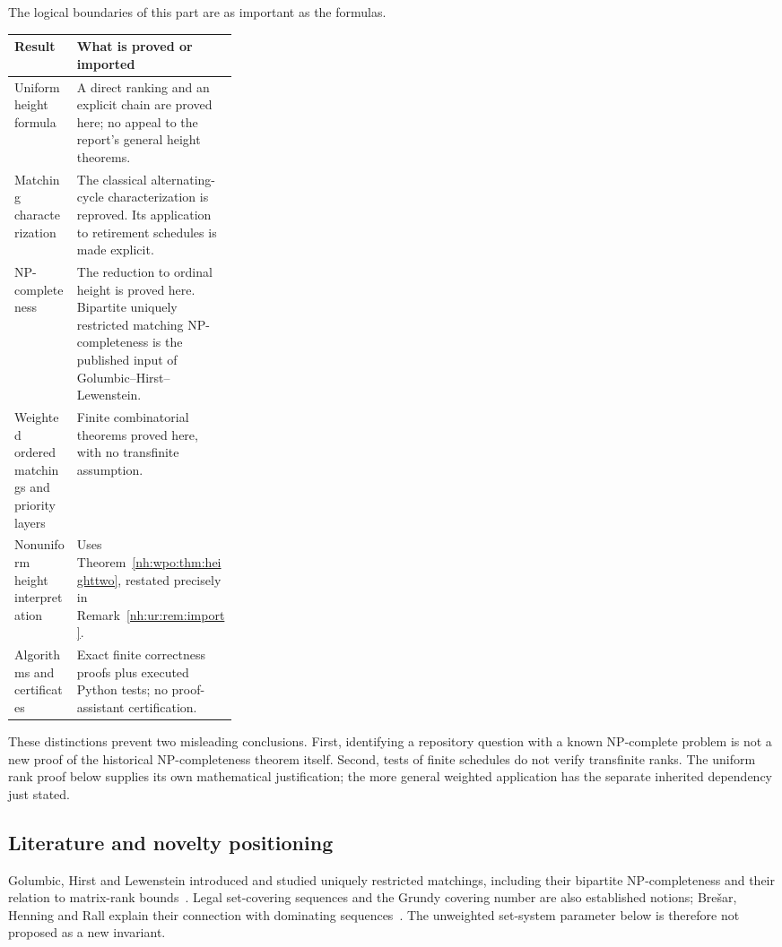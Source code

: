 \documentclass[11pt,a4paper]{article}
\theoremstyle{definition}
\theoremstyle{remark}
\begin{document}
The logical boundaries of this part are as important as the formulas.
\begin{center}\small
\begin{tabularx}{\linewidth}{@{}p{0.29\linewidth}X@{}}
\toprule
Result & What is proved or imported\\
\midrule
Uniform height formula & A direct ranking and an explicit chain are proved here;
no appeal to the report's general height theorems.\\
Matching characterization & The classical alternating-cycle characterization is
reproved. Its application to retirement schedules is made explicit.\\
NP-completeness & The reduction to ordinal height is proved here. Bipartite
uniquely restricted matching NP-completeness is the published input of
Golumbic--Hirst--Lewenstein.\\
Weighted ordered matchings and priority layers & Finite combinatorial theorems
proved here, with no transfinite assumption.\\
Nonuniform height interpretation & Uses Theorem~\ref{nh:wpo:thm:heighttwo},
restated precisely in Remark~\ref{nh:ur:rem:import}.\\
Algorithms and certificates & Exact finite correctness proofs plus executed
Python tests; no proof-assistant certification.\\
\bottomrule
\end{tabularx}
\end{center}

These distinctions prevent two misleading conclusions. First, identifying a
repository question with a known NP-complete problem is not a new proof of the
historical NP-completeness theorem itself. Second, tests of finite schedules do
not verify transfinite ranks. The uniform rank proof below supplies its own
mathematical justification; the more general weighted application has the
separate inherited dependency just stated.

\subsection{Literature and novelty positioning}\label{nh:ur:sec:literature}

Golumbic, Hirst and Lewenstein introduced and studied uniquely restricted
matchings, including their bipartite NP-completeness and their relation to
matrix-rank bounds~\cite{GHL2001}. Legal set-covering sequences and the Grundy
covering number are also established notions; Bre\v{s}ar, Henning and Rall
explain their connection with dominating sequences~\cite{BHR2016}. The
unweighted set-system parameter below is therefore not proposed as a new
invariant.
\end{document}
